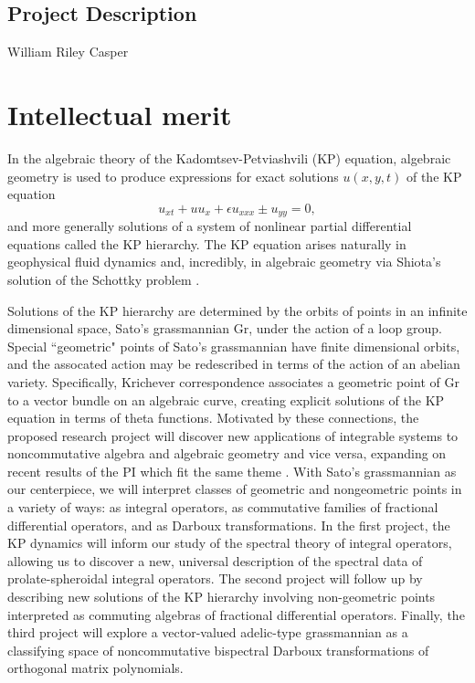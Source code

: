 \documentclass[11pt,letterpaper]{article}
\newcommand{\required}[1]{\section*{\hfil #1\hfil}}                    %
\theoremstyle{definition}
\newcommand{\Gr}{\text{Gr}}
\begin{document}
\begin{center}
\required{Project Description}
William Riley Casper
\end{center}

\section{Intellectual merit}
In the algebraic theory of the Kadomtsev-Petviashvili (KP) equation, algebraic geometry is used to produce expressions for exact solutions $u(x,y,t)$ of the KP equation
\begin{equation}
u_{xt} + uu_x + \epsilon u_{xxx} \pm u_{yy} = 0,
\end{equation}
and more generally solutions of a system of nonlinear partial differential equations called the KP hierarchy.
The KP equation arises naturally in geophysical fluid dynamics and, incredibly, in algebraic geometry via Shiota's solution of the Schottky problem \cite{shiota}.

Solutions of the KP hierarchy are determined by the orbits of points in an infinite dimensional space, Sato's grassmannian $\Gr$, under the action of a loop group.
Special ``geometric" points of Sato's grassmannian have finite dimensional orbits, and the assocated action may be redescribed in terms of the action of an abelian variety.  Specifically, Krichever correspondence associates a geometric point of $\Gr$ to a vector bundle on an algebraic curve, creating explicit solutions of the KP equation in terms of theta functions.
Motivated by these connections, the proposed research project will discover new applications of integrable systems to noncommutative algebra and algebraic geometry and vice versa, expanding on recent results of the PI which fit the same theme \cite{CGYZ2,CGYZ,CY2019,CY2018}.
With Sato's grassmannian as our centerpiece, we will interpret classes of geometric and nongeometric points in a variety of ways: as integral operators, as commutative families of fractional differential operators, and as Darboux transformations.  In the first project, the KP dynamics will inform our study of the spectral theory of integral operators, allowing us to discover a new, universal description of the spectral data of prolate-spheroidal integral operators.
The second project will follow up by describing new solutions of the KP hierarchy involving non-geometric points interpreted as commuting algebras of fractional differential operators.
Finally, the third project will explore a vector-valued adelic-type grassmannian as a classifying space of noncommutative bispectral Darboux transformations of orthogonal matrix polynomials.
\end{document}
